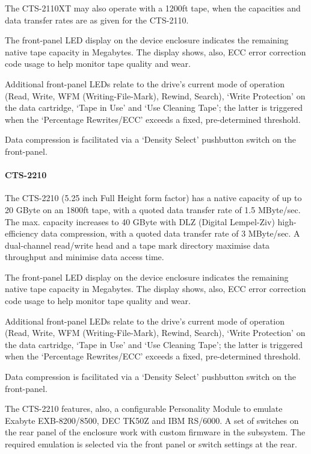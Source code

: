 \documentclass[11pt]{article}
\begin{document}
The CTS-2110XT may also operate with a 1200ft tape, when the capacities and
data transfer rates are as given for the CTS-2110.

The front-panel LED display on the device enclosure indicates the remaining
native tape capacity in Megabytes. The display shows, also, ECC error
correction code usage to help monitor tape quality and wear.

Additional front-panel LEDs relate to the drive's current mode of operation
(Read, Write, WFM (Writing-File-Mark), Rewind, Search), `Write Protection' on
the data cartridge, `Tape in Use' and `Use Cleaning Tape'; the latter is
triggered when the `Percentage Rewrites/ECC' exceeds a fixed, pre-determined
threshold.

Data compression is facilitated via a `Density Select' pushbutton switch on the
front-panel.

\paragraph {CTS-2210}

The CTS-2210 (5.25 inch Full Height form factor) has a native capacity of up
to 20 GByte on an 1800ft tape, with a quoted data transfer rate of 1.5
MByte/sec. The max. capacity increases to 40 GByte with DLZ (Digital Lempel-Ziv)
high-efficiency data compression, with a quoted data transfer rate of 3
MByte/sec. A dual-channel read/write head and a tape mark directory maximise
data throughput and minimise data access time.

The front-panel LED display on the device enclosure indicates the remaining
native tape capacity in Megabytes. The display shows, also, ECC error
correction code usage to help monitor tape quality and wear.

Additional front-panel LEDs relate to the drive's current mode of operation
(Read, Write, WFM (Writing-File-Mark), Rewind, Search), `Write Protection' on
the data cartridge, `Tape in Use' and `Use Cleaning Tape'; the latter is
triggered when the `Percentage Rewrites/ECC' exceeds a fixed, pre-determined
threshold.

Data compression is facilitated via a `Density Select' pushbutton switch on the
front-panel.

The CTS-2210 features, also, a configurable Personality Module to emulate
Exabyte EXB-8200/8500, DEC TK50Z and IBM RS/6000. A set of switches on the rear
panel of the enclosure work with custom firmware in the subsystem. The required
emulation is selected via the front panel or switch settings at the rear.
\end{document}
